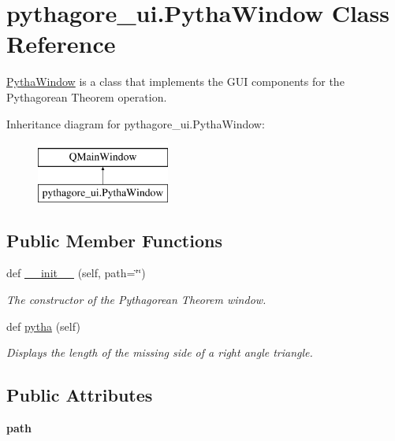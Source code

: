 \hypertarget{classpythagore__ui_1_1_pytha_window}{}\section{pythagore\+\_\+ui.\+Pytha\+Window Class Reference}
\label{classpythagore__ui_1_1_pytha_window}


\hyperlink{classpythagore__ui_1_1_pytha_window}{Pytha\+Window} is a class that implements the G\+UI components for the Pythagorean Theorem operation.  


Inheritance diagram for pythagore\+\_\+ui.\+Pytha\+Window\+:\begin{figure}[H]
\begin{center}
\leavevmode
\includegraphics[height=2.000000cm]{classpythagore__ui_1_1_pytha_window}
\end{center}
\end{figure}
\subsection*{Public Member Functions}
\begin{DoxyCompactItemize}
\item 
def \hyperlink{classpythagore__ui_1_1_pytha_window_a3a9be6ba9c7645923a6e2a9eba16aa23}{\+\_\+\+\_\+init\+\_\+\+\_\+} (self, path=\char`\"{}\char`\"{})
\begin{DoxyCompactList}\small\item\em The constructor of the Pythagorean Theorem window. \end{DoxyCompactList}\item 
def \hyperlink{classpythagore__ui_1_1_pytha_window_accb4cda1de730c8001b0856b8327700a}{pytha} (self)
\begin{DoxyCompactList}\small\item\em Displays the length of the missing side of a right angle triangle. \end{DoxyCompactList}\end{DoxyCompactItemize}
\subsection*{Public Attributes}
\begin{DoxyCompactItemize}
\item 
\mbox{\label{classpythagore__ui_1_1_pytha_window_a250c9e50d023f6a7344b10e87e57badf}} 
{\bfseries path}
\end{DoxyCompactItemize}



